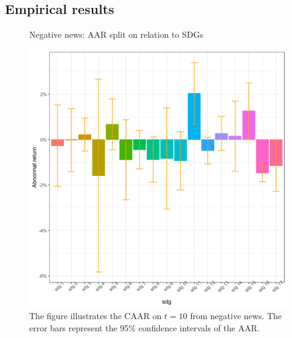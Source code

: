 \subsection{Empirical results}

\begin{figure} [H]
    \centering
    \caption{Negative news: AAR split on relation to SDGs}
    \includegraphics[scale=0.5]{Projekt/1.Figures analysis/ST_negative_sdg_bar.png}
    \caption*{\footnotesize The figure illustrates the CAAR on $t = 10$ from negative news. The error bars represent the 95\% confidence intervals of the AAR.}
    \label{fig:ST_neg_bar_all}
\end{figure}

